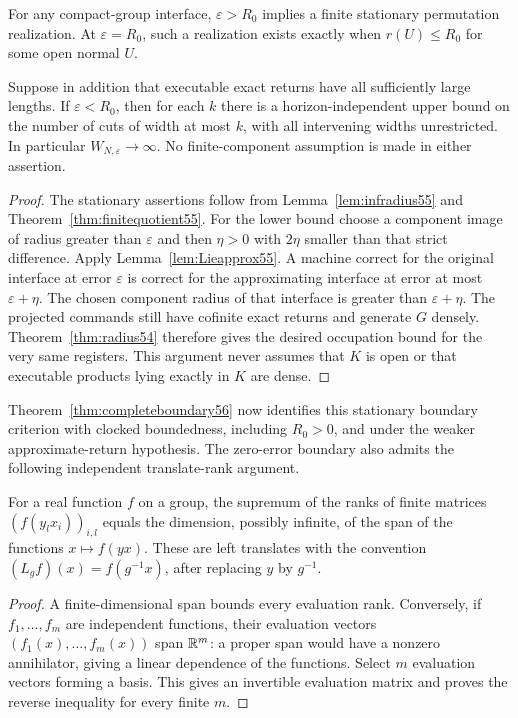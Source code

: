 \begin{theorem}\label{thm:profinite55}
For any compact-group interface, $\varepsilon>R_0$ implies a finite stationary permutation realization. At $\varepsilon=R_0$, such a realization exists exactly when $r(U)\le R_0$ for some open normal $U$.

Suppose in addition that executable exact returns have all sufficiently large lengths. If $\varepsilon<R_0$, then for each $k$ there is a horizon-independent upper bound on the number of cuts of width at most $k$, with all intervening widths unrestricted. In particular $W_{N,\varepsilon}\to\infty$. No finite-component assumption is made in either assertion.
\end{theorem}
\begin{proof}
The stationary assertions follow from Lemma~\ref{lem:infradius55} and Theorem~\ref{thm:finitequotient55}. For the lower bound choose a component image of radius greater than $\varepsilon$ and then $\eta>0$ with $2\eta$ smaller than that strict difference. Apply Lemma~\ref{lem:Lieapprox55}. A machine correct for the original interface at error $\varepsilon$ is correct for the approximating interface at error at most $\varepsilon+\eta$. The chosen component radius of that interface is greater than $\varepsilon+\eta$. The projected commands still have cofinite exact returns and generate $G$ densely. Theorem~\ref{thm:radius54} therefore gives the desired occupation bound for the very same registers. This argument never assumes that $K$ is open or that executable products lying exactly in $K$ are dense.
\end{proof}
Theorem~\ref{thm:completeboundary56} now identifies this stationary boundary criterion with clocked boundedness, including $R_0>0$, and under the weaker approximate-return hypothesis. The zero-error boundary also admits the following independent translate-rank argument.

\begin{lemma}\label{lem:evaluation56}
For a real function $f$ on a group, the supremum of the ranks of finite matrices $(f(y_lx_i))_{i,l}$ equals the dimension, possibly infinite, of the span of the functions $x\mapsto f(yx)$. These are left translates with the convention $(L_gf)(x)=f(g^{-1}x)$, after replacing $y$ by $g^{-1}$.
\end{lemma}
\begin{proof}
A finite-dimensional span bounds every evaluation rank. Conversely, if $f_1,\ldots,f_m$ are independent functions, their evaluation vectors $(f_1(x),\ldots,f_m(x))$ span $\mathbb R^m$: a proper span would have a nonzero annihilator, giving a linear dependence of the functions. Select $m$ evaluation vectors forming a basis. This gives an invertible evaluation matrix and proves the reverse inequality for every finite $m$.
\end{proof}

